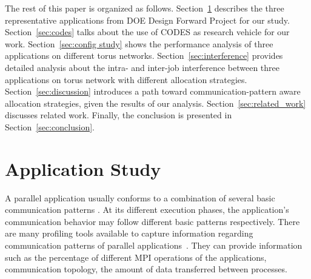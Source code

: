 \documentclass[conference]{IEEEtran}
\begin{document}
The rest of this paper is organized as follows. Section~\ref{sec:application study} describes the three representative applications from DOE Design Forward Project for our study. Section~\ref{sec:codes} talks about the use of CODES as research vehicle for our work. Section~\ref{sec:config study} shows the performance analysis of three applications on different torus networks. Section~\ref{sec:interference} provides detailed analysis about the intra- and inter-job interference between three applications on torus network with different allocation strategies. Section~\ref{sec:discussion} introduces a path toward communication-pattern aware allocation strategies, given the results of our analysis. Section~\ref{sec:related_work} discusses related work. Finally, the conclusion is presented in Section~\ref{sec:conclusion}.




\section{Application Study}
\label{sec:application study}


A parallel application usually conforms to a combination of several basic communication patterns \cite{roth}. At its different execution phases, the application's communication behavior may follow different basic patterns respectively. There are many profiling tools available to capture information regarding communication patterns of parallel applications~\cite{tau,mpip,scala,sst,oxbow}. They can provide information such as the percentage of different MPI operations of the applications, communication topology, the amount of data transferred between processes.
\end{document}
